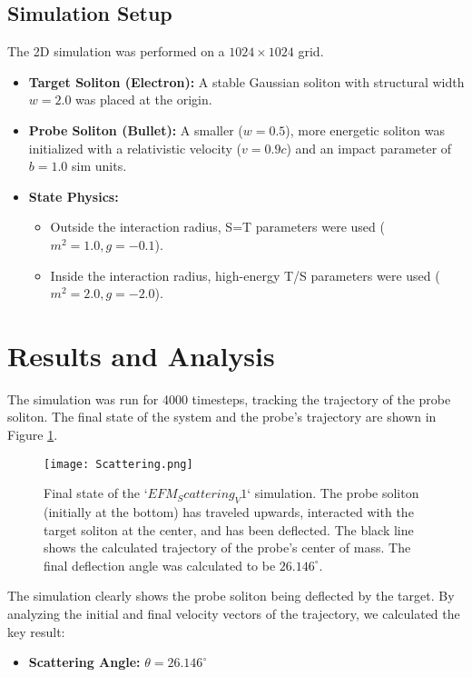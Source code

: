 \documentclass[11pt, twoside]{article}
\begin{document}
\subsection{Simulation Setup}
The 2D simulation was performed on a \(1024 \times 1024\) grid.
\begin{itemize}
    \item \textbf{Target Soliton (Electron):} A stable Gaussian soliton with structural width \(w=2.0\) was placed at the origin.
    \item \textbf{Probe Soliton (Bullet):} A smaller (\(w=0.5\)), more energetic soliton was initialized with a relativistic velocity (\(v=0.9c\)) and an impact parameter of \(b=1.0\) sim units.
    \item \textbf{State Physics:}
        \begin{itemize}
            \item Outside the interaction radius, S=T parameters were used (\(m^2=1.0, g=-0.1\)).
            \item Inside the interaction radius, high-energy T/S parameters were used (\(m^2=2.0, g=-2.0\)).
        \end{itemize}
\end{itemize}

\section{Results and Analysis}
The simulation was run for 4000 timesteps, tracking the trajectory of the probe soliton. The final state of the system and the probe's trajectory are shown in Figure \ref{fig:scattering}.

\begin{figure}[htbp!]
\centering
\texttt{[image: Scattering.png]}
\caption{Final state of the `$EFM_Scattering_V1$` simulation. The probe soliton (initially at the bottom) has traveled upwards, interacted with the target soliton at the center, and has been deflected. The black line shows the calculated trajectory of the probe's center of mass. The final deflection angle was calculated to be \(26.146^\circ\).}
\label{fig:scattering}
\end{figure}

The simulation clearly shows the probe soliton being deflected by the target. By analyzing the initial and final velocity vectors of the trajectory, we calculated the key result:
\begin{itemize}
    \item \textbf{Scattering Angle:} \(\theta = 26.146^\circ\)
\end{itemize}
\end{document}
